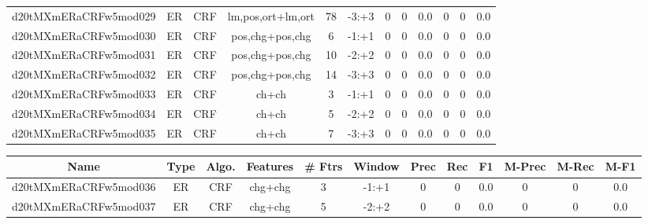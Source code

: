 \documentclass[a4paper]{article}
\begin{document}
\begin{landscape}
\begin{center}
\begin{tabular}{ |c|c|c|c|c|c|c|c|c|c|c|c|}
 
 	
 	\small{ d20tMXmERaCRFw5mod029 } & ER & CRF & lm,pos,ort+lm,ort  &  78 &  -3:+3  &  0 & 0 & 0.0  &  0 & 0 & 0.0 \\
 	

 
 	
 	\small{ d20tMXmERaCRFw5mod030 } & ER & CRF & pos,chg+pos,chg  &  6 &  -1:+1  &  0 & 0 & 0.0  &  0 & 0 & 0.0 \\
 	

 
 	
 	\small{ d20tMXmERaCRFw5mod031 } & ER & CRF & pos,chg+pos,chg  &  10 &  -2:+2  &  0 & 0 & 0.0  &  0 & 0 & 0.0 \\
 	

 
 	
 	\small{ d20tMXmERaCRFw5mod032 } & ER & CRF & pos,chg+pos,chg  &  14 &  -3:+3  &  0 & 0 & 0.0  &  0 & 0 & 0.0 \\
 	

 
 	
 	\small{ d20tMXmERaCRFw5mod033 } & ER & CRF & ch+ch  &  3 &  -1:+1  &  0 & 0 & 0.0  &  0 & 0 & 0.0 \\
 	

 
 	
 	\small{ d20tMXmERaCRFw5mod034 } & ER & CRF & ch+ch  &  5 &  -2:+2  &  0 & 0 & 0.0  &  0 & 0 & 0.0 \\
 	

 
 	
 	\small{ d20tMXmERaCRFw5mod035 } & ER & CRF & ch+ch  &  7 &  -3:+3  &  0 & 0 & 0.0  &  0 & 0 & 0.0 \\
 	
 \hline
\end{tabular}
\end{center}




\begin{center}
\begin{tabular}{ |c|c|c|c|c|c|c|c|c|c|c|c|} 
 \hline
 	Name & Type & Algo. & Features & \# Ftrs & Window & Prec & Rec & F1 & M-Prec & M-Rec & M-F1\\
 \hline

 	

 
 	
 	\small{ d20tMXmERaCRFw5mod036 } & ER & CRF & chg+chg  &  3 &  -1:+1  &  0 & 0 & 0.0  &  0 & 0 & 0.0 \\
 	

 
 	
 	\small{ d20tMXmERaCRFw5mod037 } & ER & CRF & chg+chg  &  5 &  -2:+2  &  0 & 0 & 0.0  &  0 & 0 & 0.0 \\
 	


\end{tabular}
\end{center}
\end{landscape}
\end{document}
